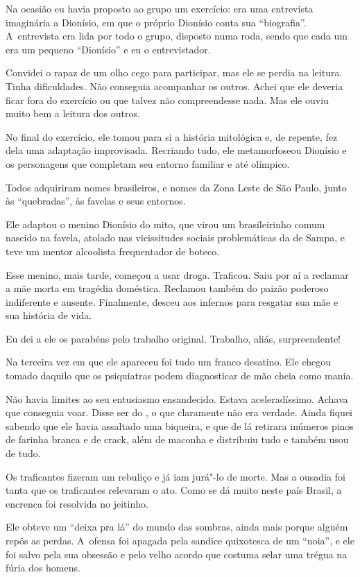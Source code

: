 Na ocasião eu havia proposto ao grupo um exercício: era uma entrevista
imaginária a Dionísio, em que o próprio Dionísio conta sua
``biografia''. A~entrevista era lida por todo o grupo, disposto numa
roda, sendo que cada um era um pequeno ``Dionísio'' e eu o
entrevistador.

Convidei o rapaz de um olho cego para participar, mas ele se perdia na
leitura. Tinha dificuldades. Não conseguia acompanhar os outros. Achei
que ele deveria ficar fora do exercício ou que talvez não compreendesse
nada. Mas ele ouviu muito bem a leitura dos outros.

No final do exercício, ele tomou para si a história mitológica e, de
repente, fez dela uma adaptação improvisada. Recriando tudo, ele
metamorfoseou Dionísio e os personagens que completam seu entorno
familiar e até olímpico.

Todos adquiriram nomes brasileiros, e nomes da Zona Leste de São Paulo,
junto às ``quebradas'', às favelas e seus entornos.

Ele adaptou o menino Dionísio do mito, que virou um brasileirinho comum
nascido na favela, atolado nas vicissitudes sociais problemáticas da  de Sampa, 
e teve um mentor alcoolista frequentador de boteco.

Esse menino, mais tarde, começou a usar droga. Traficou. Saiu por aí a
reclamar a mãe morta em tragédia doméstica. Reclamou também do paizão
poderoso indiferente e ausente. Finalmente, desceu aos infernos para
resgatar sua mãe e sua história de vida.

Eu dei a ele os parabéns pelo trabalho original. Trabalho, aliás,
surpreendente!

\asterisc{}

Na terceira vez em que ele apareceu foi tudo um franco desatino. Ele
chegou tomado daquilo que os psiquiatras podem diagnosticar de mão cheia
como mania.

Não havia limites ao seu entusiasmo ensandecido. Estava aceleradíssimo.
Achava que conseguia voar. Disse ser do , o que claramente não era verdade. 
Ainda fiquei sabendo que ele havia assaltado uma biqueira, e
que de lá retirara inúmeros pinos de farinha branca e de crack, além de
maconha e distribuiu tudo e também usou de tudo.

Os traficantes fizeram um rebuliço e já iam jurá"-lo de morte. Mas a
ousadia foi tanta que os traficantes relevaram o ato. Como se dá muito
neste país Brasil, a encrenca foi resolvida no jeitinho.

Ele obteve um ``deixa pra lá'' do mundo das sombras, ainda mais porque
alguém repôs as perdas. A~ofensa foi apagada pela sandice quixotesca de
um ``noia'', e ele foi salvo pela sua obsessão e pelo velho acordo que
costuma selar uma trégua na fúria dos homens.


